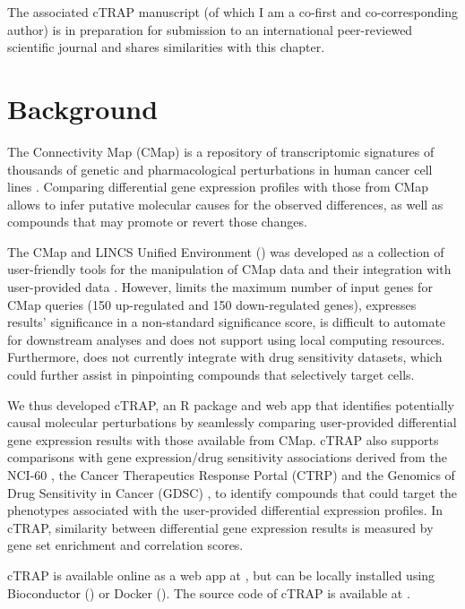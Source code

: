 The associated cTRAP manuscript (of which I am a co-first and co-corresponding author) is in preparation for submission to an international peer-reviewed scientific journal and shares similarities with this chapter.

\section{Background}

The Connectivity Map (CMap) is a repository of transcriptomic signatures of thousands of genetic and pharmacological perturbations in human cancer cell lines \cite{subramanian:2017ul}. Comparing differential gene expression profiles with those from CMap allows to infer putative molecular causes for the observed differences, as well as compounds that may promote or revert those changes.

The CMap and LINCS Unified Environment () was developed as a collection of user-friendly tools for the manipulation of CMap data and their integration with user-provided data \cite{subramanian:2017ul}. However,  limits the maximum number of input genes for CMap queries (150 up-regulated and 150 down-regulated genes), expresses results' significance in a non-standard significance score, is difficult to automate for downstream analyses and does not support using local computing resources. Furthermore,  does not currently integrate with drug sensitivity datasets, which could further assist in pinpointing compounds that selectively target cells.

We thus developed cTRAP, an R package and web app that identifies potentially causal molecular perturbations by seamlessly comparing user-provided differential gene expression results with those available from CMap. cTRAP also supports comparisons with gene expression/drug sensitivity associations derived from the NCI-60 \cite{shoemaker:2006wi}, the Cancer Therapeutics Response Portal (CTRP) \cite{seashore-ludlow:2015ws} and the Genomics of Drug Sensitivity in Cancer (GDSC) \cite{yang:2012vk}, to identify compounds that could target the phenotypes associated with the user-provided differential expression profiles. In cTRAP, similarity between differential gene expression results is measured by gene set enrichment \cite{subramanian:2017ul,subramanian:2005wu} and correlation scores.

cTRAP is available online as a web app at , but can be locally installed using Bioconductor () or Docker (). The source code of cTRAP is available at .

